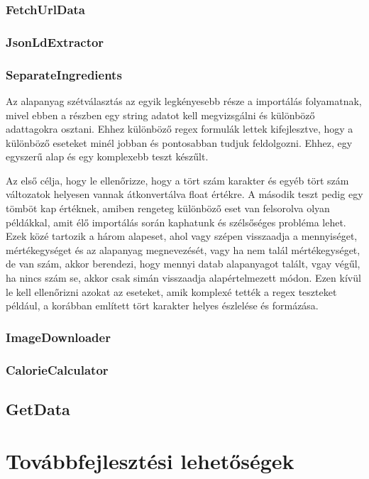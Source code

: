 \documentclass[12pt]{report}
\theoremstyle{definition}
\begin{document}
\subsection{FetchUrlData}

\subsection{JsonLdExtractor}

\subsection{SeparateIngredients}
Az alapanyag szétválasztás az egyik legkényesebb része a importálás folyamatnak, mivel ebben a részben egy string adatot kell megvizsgálni és különböző adattagokra osztani. Ehhez különböző regex formulák lettek kifejlesztve, hogy a különböző eseteket minél jobban és pontosabban tudjuk feldolgozni. Ehhez, egy egyszerű alap és egy komplexebb teszt készűlt.

Az első célja, hogy le ellenőrizze, hogy a tört szám karakter és egyéb tört szám változatok helyesen vannak átkonvertálva float értékre. A második teszt pedig egy tömböt kap értéknek, amiben rengeteg különböző eset van felsorolva olyan példákkal, amit élő importálás során kaphatunk és szélsőséges probléma lehet. Ezek közé tartozik a három alapeset, ahol vagy szépen visszaadja a mennyiséget, mértékegységet és az alapanyag megnevezését, vagy ha nem talál mértékegységet, de van szám, akkor berendezi, hogy mennyi datab alapanyagot talált, vgay végűl, ha nincs szám se, akkor csak simán visszaadja alapértelmezett módon. Ezen kívül le kell ellenőrizni azokat az eseteket, amik komplexé tették a regex teszteket például, a korábban említett tört karakter helyes észlelése és formázása.

\subsection{ImageDownloader}

\subsection{CalorieCalculator}

\section{GetData}

\chapter{Továbbfejlesztési lehetőségek}
\end{document}
